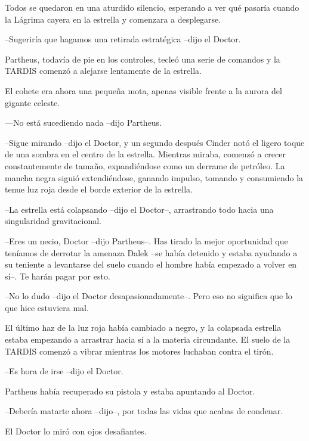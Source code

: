 Todos se quedaron en una aturdido silencio, esperando a ver qué pasaría cuando la Lágrima cayera en la estrella y comenzara a desplegarse.

--Sugeriría que hagamos una retirada estratégica --dijo el Doctor.



Partheus, todavía de pie en los controles, tecleó una serie de comandos y la TARDIS comenzó a alejarse lentamente de la estrella.

El cohete era ahora una pequeña mota, apenas visible frente a la aurora del gigante celeste.



---No está sucediendo nada --dijo Partheus.

--Sigue mirando --dijo el Doctor, y un segundo después Cinder notó el ligero toque de una sombra en el centro de la estrella. Mientras miraba, comenzó a crecer constantemente de tamaño, expandiéndose como un derrame de petróleo. La mancha negra siguió extendiéndose, ganando impulso, tomando y consumiendo la tenue luz roja desde el borde exterior de la estrella.

--La estrella está colapsando --dijo el Doctor--, arrastrando todo hacia una singularidad gravitacional.

--Eres un necio, Doctor --dijo Partheus--. Has tirado la mejor oportunidad que teníamos de derrotar la amenaza Dalek --se había detenido y estaba ayudando a su teniente a levantarse del suelo cuando el hombre había empezado a volver en sí--. Te harán pagar por esto.

--No lo dudo --dijo el Doctor desapasionadamente--. Pero eso no significa que lo que hice estuviera mal.



El último haz de la luz roja había cambiado a negro, y la colapsada estrella estaba empezando a arrastrar hacia sí a la materia circundante. El suelo de la TARDIS comenzó a vibrar mientras los motores luchaban contra el tirón.



--Es hora de irse --dijo el Doctor.



Partheus había recuperado su pistola y estaba apuntando al Doctor.



--Debería matarte ahora --dijo--, por todas las vidas que acabas de condenar.



El Doctor lo miró con ojos desafiantes. 



